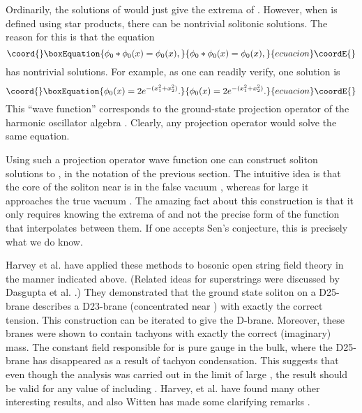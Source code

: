 \documentclass[a4paper,12pt]{article}
\begin{document}
Ordinarily, the solutions of \coordHE{} would just
give the extrema of \coordHE{}.  However, when \coordHE{} is defined using star
products, there can be nontrivial solitonic solutions. The reason
for this is that the equation
\begin{equation}\coord{}\boxEquation{
\phi_0 * \phi_0 (x) = \phi_0 (x),
}{
\phi_0 * \phi_0 (x) = \phi_0 (x),
}{ecuacion}\coordE{}\end{equation}
has nontrivial solutions.  For example, as one can readily verify, one solution
is
\begin{equation}\coord{}\boxEquation{
\phi_0 (x) = 2e^{-(x_{1}^{2} + x_{2}^{2})}.
}{
\phi_0 (x) = 2e^{-(x_{1}^{2} + x_{2}^{2})}.
}{ecuacion}\coordE{}\end{equation}
This ``wave function'' corresponds to the ground-state projection operator
\coordHE{} of the harmonic oscillator algebra \coordHE{}.
Clearly, any projection operator would solve the same equation.

Using such a projection operator wave function \coordHE{} one can
construct soliton solutions \coordHE{} to \coordHE{}, in the notation of the previous section.  The intuitive idea
is that the core of the soliton near \coordHE{} is in the
false vacuum \coordHE{}, whereas for large \coordHE{} it
approaches the true vacuum \coordHE{}.  The amazing fact about this
construction is that it only requires knowing the extrema of
\coordHE{} and not the precise form of the function that interpolates
between them.  If one accepts Sen's conjecture, this is precisely
what we do know.

Harvey et al. \cite {HKLM} have
applied these methods to bosonic open string field theory in the
manner indicated above. (Related ideas for superstrings were discussed by
Dasgupta et al. \cite{DMR}.)
They demonstrated that the ground state
\coordHE{} soliton on a D25-brane describes a D23-brane
(concentrated near \coordHE{}) with exactly the correct
tension.  This construction can be iterated to give the
D\coordHE{}-brane. Moreover, these branes were shown to contain
tachyons with exactly the correct (imaginary) mass. The constant
\coordHE{} field responsible for \myHighlight{$\theta$}\coordHE{} is pure gauge in the bulk,
where the D25-brane has disappeared as a result of tachyon
condensation.  This suggests that even though the analysis was
carried out in the limit of large \myHighlight{$\theta$}\coordHE{}, the result should be
valid for any value of \myHighlight{$\theta$}\coordHE{} including \coordHE{}.  
Harvey, et al. have found many other
interesting results, and also Witten has made some clarifying
remarks \cite{W4}.
\end{document}
